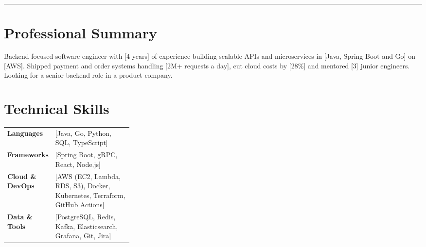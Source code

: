 \documentclass[10pt]{article}
\begin{document}
\fontsize{10.5}{13.2}\selectfont
{\setlength{\fboxrule}{0.4pt}\renewcommand{\arraystretch}{1.1}}\par{\color{accent}\rule{\linewidth}{1.8pt}}\par\vspace{8pt}

\section{Professional Summary}

Backend-focused software engineer with [4 years] of experience building scalable APIs and microservices in [Java, Spring Boot and Go] on [AWS]. Shipped payment and order systems handling [2M+ requests a day], cut cloud costs by [28\%] and mentored [3] junior engineers. Looking for a senior backend role in a product company.\par\vspace{4pt}

\section{Technical Skills}

\begin{tabularx}{\linewidth}{@{}p{0.3\linewidth}X@{}}
\textbf{Languages} & [Java, Go, Python, SQL, TypeScript] \\
\textbf{Frameworks} & [Spring Boot, gRPC, React, Node.js] \\
\textbf{Cloud \& DevOps} & [AWS (EC2, Lambda, RDS, S3), Docker, Kubernetes, Terraform, GitHub Actions] \\
\textbf{Data \& Tools} & [PostgreSQL, Redis, Kafka, Elasticsearch, Grafana, Git, Jira] \\
\end{tabularx}\par\vspace{2pt}
\end{document}
